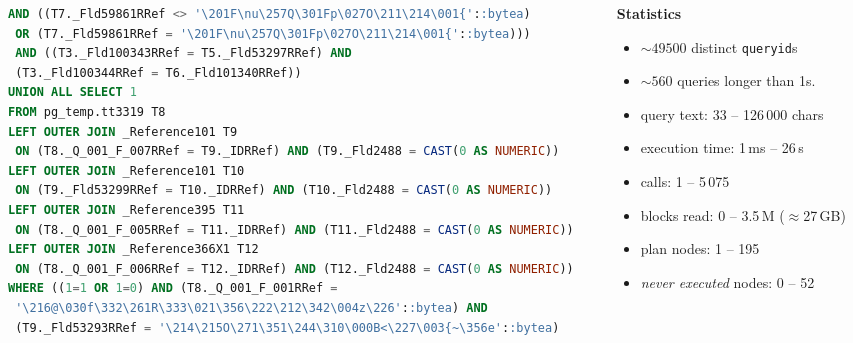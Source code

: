 \documentclass{beamer}
\begin{document}
\begin{frame}[fragile]
\begin{columns}[T]
\begin{column}{0.55\textwidth}
\begin{tcolorbox}[enhanced, sharp corners=downhill, arc=1pt,
  colback=paper, colframe=mailrule, boxrule=0.4pt,
  left=3pt, right=3pt, top=3pt, bottom=2pt,
  before skip=0pt, after skip=2pt]
\begin{lstlisting}[language=SQL, breaklines=true, columns=fixed,
  basicstyle=\ttfamily\fontsize{3.1}{3.5}\selectfont,
  keywordstyle=\ttfamily]
 AND ((T7._Fld59861RRef <> '\201F\nu\257Q\301Fp\027O\211\214\001{'::bytea)
 OR (T7._Fld59861RRef = '\201F\nu\257Q\301Fp\027O\211\214\001{'::bytea)))
 AND ((T3._Fld100343RRef = T5._Fld53297RRef) AND
 (T3._Fld100344RRef = T6._Fld101340RRef))
UNION ALL SELECT 1
FROM pg_temp.tt3319 T8
LEFT OUTER JOIN _Reference101 T9
 ON (T8._Q_001_F_007RRef = T9._IDRRef) AND (T9._Fld2488 = CAST(0 AS NUMERIC))
LEFT OUTER JOIN _Reference101 T10
 ON (T9._Fld53299RRef = T10._IDRRef) AND (T10._Fld2488 = CAST(0 AS NUMERIC))
LEFT OUTER JOIN _Reference395 T11
 ON (T8._Q_001_F_005RRef = T11._IDRRef) AND (T11._Fld2488 = CAST(0 AS NUMERIC))
LEFT OUTER JOIN _Reference366X1 T12
 ON (T8._Q_001_F_006RRef = T12._IDRRef) AND (T12._Fld2488 = CAST(0 AS NUMERIC))
WHERE ((1=1 OR 1=0) AND (T8._Q_001_F_001RRef =
 '\216@\030f\332\261R\333\021\356\222\212\342\004z\226'::bytea) AND
 (T9._Fld53293RRef = '\214\215O\271\351\244\310\000B<\227\003{~\356e'::bytea)
\end{lstlisting}
\end{tcolorbox}
\end{column}

\begin{column}{0.45\textwidth}
\begin{center}
	{\scriptsize\textbf{Statistics}}
\end{center}
\par\vspace{2pt}
{\scriptsize
\begin{itemize}\itemsep2pt
 \item $\sim49500$ distinct \texttt{queryid}s
 \item $\sim560$ queries longer than 1s.
 \item query text: 33 -- 126\,000 chars
 \item execution time: 1\,ms -- 26\,s
 \item calls: 1 -- 5\,075
 \item blocks read: 0 -- 3.5\,M ($\approx$27\,GB)
 \item plan nodes: 1 -- 195
 \item \emph{never executed} nodes: 0 -- 52
\end{itemize}
}
\end{column}

\end{columns}
\end{frame}

\end{document}
